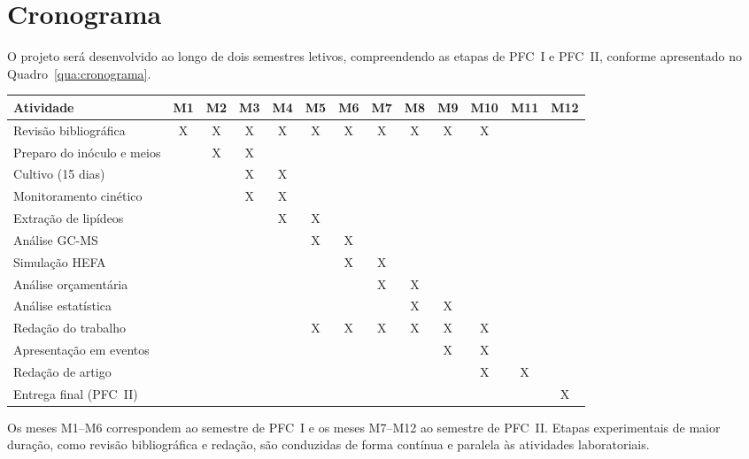 
\section{Cronograma}

O projeto será desenvolvido ao longo de dois semestres letivos,
compreendendo as etapas de PFC~I e PFC~II, conforme apresentado no
Quadro~\ref{qua:cronograma}.

\label{qua:cronograma}

\begin{table}[H]
\centering
\begin{tabular}{|p{4.8cm}|c|c|c|c|c|c|c|c|c|c|c|c|}
\hline
\textbf{Atividade} &
\textbf{M1} & \textbf{M2} & \textbf{M3} & \textbf{M4} & \textbf{M5} &
\textbf{M6} & \textbf{M7} & \textbf{M8} & \textbf{M9} & \textbf{M10} &
\textbf{M11} & \textbf{M12} \\
\hline
Revisão bibliográfica        & X & X & X & X & X & X & X & X & X & X &   &   \\
\hline
Preparo do inóculo e meios   &   & X & X &   &   &   &   &   &   &   &   &   \\
\hline
Cultivo (15 dias)            &   &   & X & X &   &   &   &   &   &   &   &   \\
\hline
Monitoramento cinético       &   &   & X & X &   &   &   &   &   &   &   &   \\
\hline
Extração de lipídeos         &   &   &   & X & X &   &   &   &   &   &   &   \\
\hline
Análise GC-MS                &   &   &   &   & X & X &   &   &   &   &   &   \\
\hline
Simulação HEFA               &   &   &   &   &   & X & X &   &   &   &   &   \\
\hline
Análise orçamentária         &   &   &   &   &   &   & X & X &   &   &   &   \\
\hline
Análise estatística          &   &   &   &   &   &   &   & X & X &   &   &   \\
\hline
Redação do trabalho          &   &   &   &   & X & X & X & X & X & X &   &   \\
\hline
Apresentação em eventos      &   &   &   &   &   &   &   &   & X & X &   &   \\
\hline
Redação de artigo            &   &   &   &   &   &   &   &   &   & X & X &   \\
\hline
Entrega final (PFC~II)       &   &   &   &   &   &   &   &   &   &   &   & X \\
\hline
\end{tabular}
\end{table}

\noindent Os meses M1--M6 correspondem ao semestre de PFC~I e os meses
M7--M12 ao semestre de PFC~II. Etapas experimentais de maior duração,
como revisão bibliográfica e redação, são conduzidas de forma contínua e
paralela às atividades laboratoriais.

